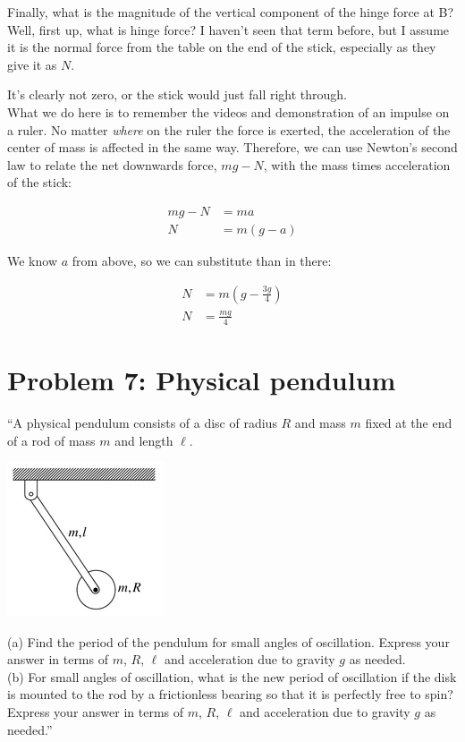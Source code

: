\documentclass[8.01x]{subfiles}
\begin{document}
Finally, what is the magnitude of the vertical component of the hinge force at B?\\
Well, first up, what is hinge force? I haven't seen that term before, but I assume it is the normal force from the table on the end of the stick, especially as they give it as $N$.

It's clearly not zero, or the stick would just fall right through.\\
What we do here is to remember the videos and demonstration of an impulse on a ruler. No matter \emph{where} on the ruler the force is exerted, the acceleration of the center of mass is affected in the same way. Therefore, we can use Newton's second law to relate the net downwards force, $m g - N$, with the mass times acceleration of the stick:

\begin{align}
m g - N &= m a\\
N &= m(g - a)
\end{align}

We know $a$ from above, so we can substitute than in there:

\begin{align}
N &= m(g - \frac{3g}{4})\\
N &= \frac{m g}{4}
\end{align}

\section{Problem 7: Physical pendulum}

``A physical pendulum consists of a disc of radius $R$ and mass $m$ fixed at the end of a rod of mass $m$ and length $\ell$.

\begin{center}
\includegraphics[scale=0.8]{Graphics/h7p7}
\end{center}

(a) Find the period of the pendulum for small angles of oscillation. Express your answer in terms of $m$, $R$, $\ell$ and acceleration due to gravity $g$ as needed.\\
(b) For small angles of oscillation, what is the new period of oscillation if the disk is mounted to the rod by a frictionless bearing so that it is perfectly free to spin? Express your answer in terms of $m$, $R$, $\ell$ and acceleration due to gravity $g$ as needed.''
\end{document}
